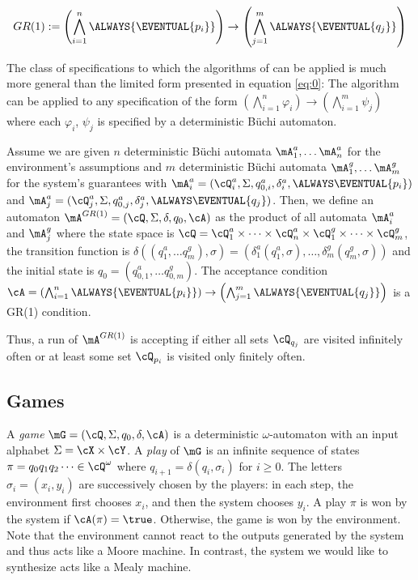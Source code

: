 \documentclass[submission,copyright,creativecommons]{eptcs}
\begin{document}
\begin{equation}
GR(1):=\left(\bigwedge_{i=1}^n \ALWAYS{\EVENTUAL{p_i}} \right) \rightarrow \left(\bigwedge_{j=1}^m \ALWAYS{\EVENTUAL{q_j}} \right)
\label{eq:0}
\end{equation}

\noindent The class of specifications to which the algorithms of \cite{BGJP07,BGJP07a,JGWB07,PiPS06} can be applied is much more general than the limited form presented in equation \ref{eq:0}: The algorithm can be applied to any specification of the form $\left(\bigwedge_{i=1}^n \varphi_i \right) \rightarrow \left(\bigwedge_{i=1}^m \psi_j \right)$ where each $\varphi_i$, $\psi_j$ is specified by a deterministic Büchi automaton.

\begin{definition}\label{def:GR1-Automaton}
Assume we are given $n$ deterministic Büchi automata $\mA_1^a, \dots \mA_n^a$ for the environment's assumptions and $m$ deterministic Büchi automata $\mA_1^g, \dots \mA_m^g$ for the system's guarantees with $\mA_i^a=(\cQ_i^a,\Sigma,q_{0,i}^a,\delta_i^a,\ALWAYS\EVENTUAL{p_i})$ and $\mA_j^a=(\cQ_j^a,\Sigma,q_{0,j}^a,\delta_j^a,\ALWAYS\EVENTUAL{q_j})$. Then, we define an automaton $\mA^{GR(1)}=(\cQ,\Sigma,\delta,q_0,\cA)$ as the product of all automata $\mA_i^a$ and $\mA_j^g$ where the state space is $\cQ=\cQ_1^a \times \dots \times \cQ_n^a\times \cQ_1^g \times \dots \times\cQ_m^g$, the transition function is $\delta((q_1^a,\dots q_m^g),\sigma)=(\delta_1^a(q_1^a,\sigma), \dots ,\delta_m^g(q_m^g,\sigma))$ and the initial state is $q_0=(q_{0,1}^a, \dots q_{0,m}^g)$. The acceptance condition $\cA=\left(\bigwedge_{i=1}^n \ALWAYS{\EVENTUAL{p_i}} \right) \rightarrow \left(\bigwedge_{j=1}^m \ALWAYS{\EVENTUAL{q_j}} \right)$ is a GR(1) condition.
\end{definition}
Thus, a run of $\mA^{GR(1)}$ is accepting if either all sets $\cQ_{q_j}$ are visited infinitely often or at least some set $\cQ_{p_i}$ is visited only finitely often.


\subsection{Games}
A \emph{game} $\mG=(\cQ,\Sigma,q_0,\delta,\cA)$ is a deterministic $\omega$-automaton with an input alphabet $\Sigma=\cX \times \cY$. A \emph{play} of $\mG$ is an infinite sequence of states $\pi=q_0q_1q_2 \dots \in \cQ^\omega$ where $q_{i+1}=\delta(q_i,\sigma_i)$ for $i \geq 0$. The letters $\sigma_i=(x_i,y_i)$ are successively chosen by the players: in each step, the environment first chooses $x_i$, and then the system chooses $y_i$. A play $\pi$ is won by the system if $\cA(\pi)=\true$. Otherwise, the game is won by the environment. Note that the environment cannot react to the outputs generated by the system and thus acts like a Moore machine. In contrast, the system we would like to synthesize acts like a Mealy machine. 
\end{document}
